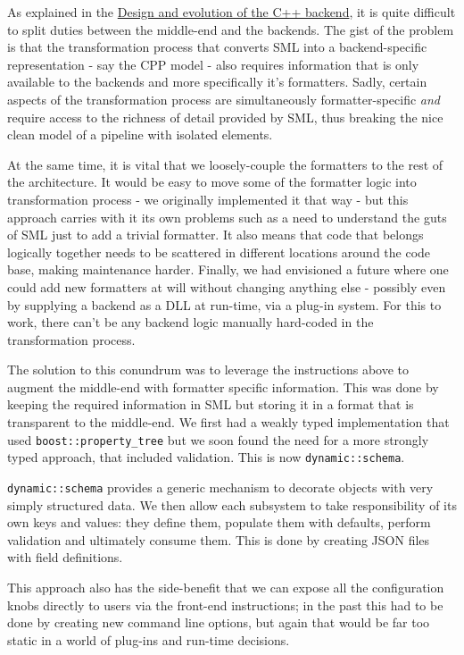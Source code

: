 \documentclass[11pt]{article}
\begin{document}
\begin{enumerate}
\begin{enumerate}
\begin{enumerate}
\begin{enumerate}
As explained in the \href{https://github.com/DomainDrivenConsulting/dogen/blob/master/doc/manual/manual.org#design-and-evolution-of-the-c-backend}{Design and evolution of the C++ backend}, it is
quite difficult to split duties between the middle-end and the
backends. The gist of the problem is that the transformation process
that converts SML into a backend-specific representation - say the CPP
model - also requires information that is only available to the
backends and more specifically it's formatters. Sadly, certain aspects
of the transformation process are simultaneously formatter-specific
\emph{and} require access to the richness of detail provided by SML, thus
breaking the nice clean model of a pipeline with isolated elements.

At the same time, it is vital that we loosely-couple the formatters to
the rest of the architecture. It would be easy to move some of the
formatter logic into transformation process - we originally
implemented it that way - but this approach carries with it its own
problems such as a need to understand the guts of SML just to add a
trivial formatter. It also means that code that belongs logically
together needs to be scattered in different locations around the code
base, making maintenance harder. Finally, we had envisioned a future
where one could add new formatters at will without changing anything
else - possibly even by supplying a backend as a DLL at run-time, via
a plug-in system. For this to work, there can't be any backend logic
manually hard-coded in the transformation process.

The solution to this conundrum was to leverage the instructions above
to augment the middle-end with formatter specific information. This
was done by keeping the required information in SML but storing it in
a format that is transparent to the middle-end. We first had a
weakly typed implementation that used \texttt{boost::property\_tree} but we
soon found the need for a more strongly typed approach, that included
validation. This is now \texttt{dynamic::schema}.

\texttt{dynamic::schema} provides a generic mechanism to decorate objects
with very simply structured data. We then allow each subsystem to take
responsibility of its own keys and values: they define them, populate
them with defaults, perform validation and ultimately consume
them. This is done by creating JSON files with field definitions.

This approach also has the side-benefit that we can expose all the
configuration knobs directly to users via the front-end instructions;
in the past this had to be done by creating new command line options,
but again that would be far too static in a world of plug-ins and
run-time decisions.
\end{enumerate}


\end{enumerate}
\end{enumerate}
\end{enumerate}
\end{document}
